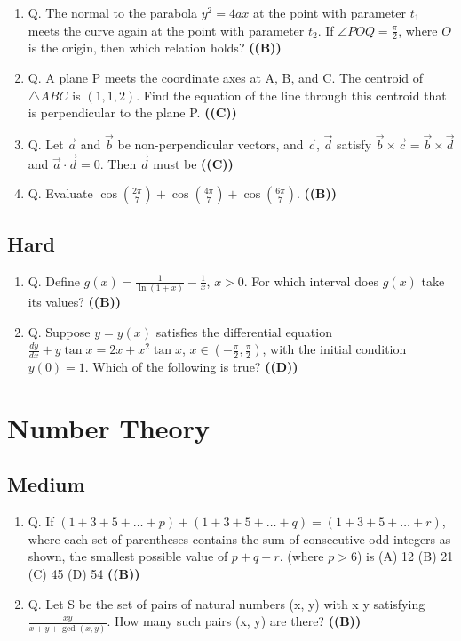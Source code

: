 \documentclass{article}
\begin{document}
\begin{enumerate}
\item Q. The normal to the parabola $y^2 = 4ax$ at the point with parameter $t_1$ meets the curve again at the point with parameter $t_2$. If $\angle POQ = \frac{\pi}{2}$, where $O$ is the origin, then which relation holds? \hfill \textbf{((B))}
\item Q. A plane P meets the coordinate axes at A, B, and C. The centroid of $\triangle ABC$ is $(1, 1, 2)$. Find the equation of the line through this centroid that is perpendicular to the plane P. \hfill \textbf{((C))}
\item Q. Let $\vec{a}$ and $\vec{b}$ be non-perpendicular vectors, and $\vec{c}$, $\vec{d}$ satisfy $\vec{b} \times \vec{c} = \vec{b} \times \vec{d}$ and $\vec{a} \cdot \vec{d} = 0$. Then $\vec{d}$ must be \hfill \textbf{((C))}
\item Q. Evaluate $\cos\left(\frac{2\pi}{7}\right) + \cos\left(\frac{4\pi}{7}\right) + \cos\left(\frac{6\pi}{7}\right)$. \hfill \textbf{((B))}
\end{enumerate}
\subsection{Hard}
\begin{enumerate}
\item Q. Define $g(x) = \frac{1}{\ln(1+x)} - \frac{1}{x}$, $x > 0$. For which interval does $g(x)$ take its values? \hfill \textbf{((B))}
\item Q. Suppose $y = y(x)$ satisfies the differential equation $\frac{dy}{dx} + y \tan x = 2x + x^2 \tan x$, $x \in (-\frac{\pi}{2}, \frac{\pi}{2})$, with the initial condition $y(0) = 1$. Which of the following is true? \hfill \textbf{((D))}
\end{enumerate}
\section{Number Theory}
\subsection{Medium}
\begin{enumerate}
\item Q. If $(1 + 3 + 5 + \dots + p) + (1 + 3 + 5 + \dots + q) = (1 + 3 + 5 + \dots + r)$, where each set of parentheses contains the sum of consecutive odd integers as shown, the smallest possible value of $p + q + r$. (where $p > 6$) is
(A) 12
(B) 21
(C) 45
(D) 54 \hfill \textbf{((B))}
\item Q. Let S be the set of pairs of natural numbers (x, y) with x \leq y satisfying $\frac{xy}{x + y + \gcd(x, y)}$. How many such pairs (x, y) are there? \hfill \textbf{((B))}
\end{enumerate}
\end{document}
